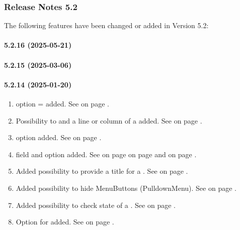 \subsubsection{Release Notes 5.2}
\label{sec:releasenotes-5-2}
The following features have been changed or added in Version 5.2:\\

\paragraph{5.2.16 (2025-05-21)}  %

\paragraph{5.2.15 (2025-03-06)}  %

\paragraph{5.2.14 (2025-01-20)}  %
\begin{enumerate}
\item \FOLDER{} option \BUTTON{} = \TRUE{} added.
      See  on page \pageref{dia:uifolderoptionlist}.
\item Possibility to \MAP{} and \UNMAP{} a line or column of a \TABLE{} added.
      See  on page \pageref{dia:jobmapelement}.
\item \TABLE{} option \AUTOWIDTH{} added.
      See  on page \pageref{dia:uitbloption}.
\item \FIELDGROUP{} field and \FIELDGROUP{} option \CLASS{} added.
      See  on page \pageref{dia:uifieldadditionalattributes}
       on page \pageref{dia:uifieldoptions} and
       on page \pageref{sec:uifieldgroupotions}.
\item Added possibility to provide a title for a \MESSAGEBOX{}.
      See  on page \pageref{dia:messageboxstatement}.
\item Added possibility to hide MenuButtons (PulldownMenu).
      See  on page \pageref{dia:jobunmapelement}.
\item Added possibility to check \EDITABLE{} state of a \FIELDGROUP.
      See  on page \pageref{dia:jobeditableaction}.
\item Option \FILE{} for \STREAM{} added.
      See  on page \pageref{dia:stoptionlist}.
\end{enumerate}

